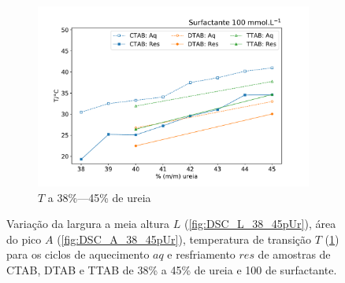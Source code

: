 \begin{figure}[H]
			\begin{subfigure}[t]{0.60\textwidth}
				\includegraphics[width=\textwidth]{./imagens/dsc/T_100mM_aq_res}
				\caption{$T$ a 38\%---45\% de ureia}
				\label{fig:DSC_T_38_45pUr}
			\end{subfigure}
			
			\caption{Variação da largura a meia altura $L$ (\ref{fig:DSC_L_38_45pUr}), área do pico $A$ (\ref{fig:DSC_A_38_45pUr}), temperatura de transição $T$ (\ref{fig:DSC_T_38_45pUr}) para os ciclos de aquecimento $aq$ e resfriamento $res$ de amostras de CTAB, DTAB e TTAB de 38\% a 45\% de ureia e 100 \mM{} de surfactante.}
			\label{fig:DSC_propriedades_Ur_38_45}
		\end{figure}
			
